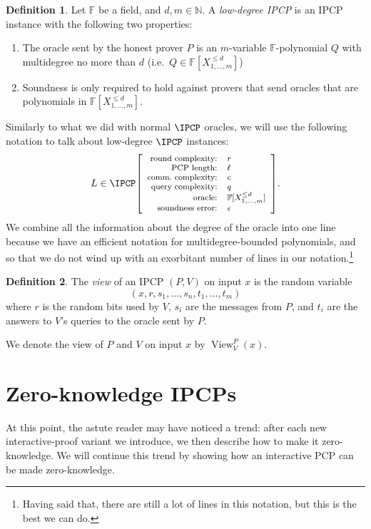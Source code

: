 \documentclass[english,12pt]{reedthesis}
\theoremstyle{plain}
\theoremstyle{definition}
\newtheorem{defn}[defn]{Definition}
\theoremstyle{remark}
\DeclareMathOperator{\View}{View}
\newcommand{\ldipcp}[6]{%
  \ensuremath%
  \mleft[{\footnotesize\begin{array}{r l}
    \text{round complexity:} & #1 \\
    \text{PCP length:} & #2 \\
    \text{comm.\ complexity:} & #3 \\
    \text{query complexity:} & #4 \\
    \text{oracle:} & #5 \\
    \text{soundness error:} & #6
  \end{array}}\mright]%
}
\begin{document}
\begin{defn}\label{def:low-deg-ipcp}
  Let $\mathbb{F}$ be a field, and $d, m \in \mathbb{N}$. A \emph{low-degree IPCP} is an
  IPCP instance with the following two properties:
  \begin{enumerate}
    \item The oracle sent by the honest prover $P$ is an $m$-variable
          $\mathbb{F}$-polynomial $Q$ with multidegree no more than $d$ (i.e.\
          $Q \in \mathbb{F}[X_{1, \ldots, m}^{\le d}]$)
    \item Soundness is only required to hold against provers that send oracles
          that are polynomials in $\mathbb{F}[X_{1, \ldots, m}^{\le d}]$.
  \end{enumerate}
\end{defn}

Similarly to what we did with normal $\IPCP$ oracles, we will use the following
notation to talk about low-degree $\IPCP$ instances:
\begin{equation*}
  L \in \IPCP\ldipcp{r}{\ell}{c}{q}{\mathbb{F}[X_{1, \ldots, m}^{\le d}]}{\varepsilon}.
\end{equation*}
We combine all the information about the degree of the oracle into one line
because we have an efficient notation for multidegree-bounded polynomials, and
so that we do not wind up with an exorbitant number of lines in our
notation.\footnote{Having said that, there are still a lot of lines in this
  notation, but this is the best we can do.}

\begin{defn}\label{def:ipcp-view}
  The \emph{view} of an IPCP $(P, V)$ on input $x$ is the random variable
  \[
    (x, r, s_{1}, \ldots, s_{n}, t_{1}, \ldots, t_{m})
  \]
  where $r$ is the random bits used by $V$, $s_{i}$ are the messages from $P$,
  and $t_{i}$ are the answers to $V$'s queries to the oracle sent by $P$.
\end{defn}

We denote the view of $P$ and $V$ on input $x$ by $\View_{V}^{P}(x)$.

\section{Zero-knowledge IPCPs}

At this point, the astute reader may have noticed a trend: after each new
interactive-proof variant we introduce, we then describe how to make it
zero-knowledge. We will continue this trend by showing how an interactive PCP
can be made zero-knowledge.
\end{document}
